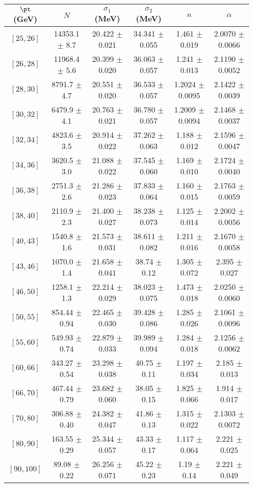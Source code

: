 \begin{tabular}{c||c|c|c|c|c}
$\pt$ (GeV) & $N$ & $\sigma_1$ (MeV) & $\sigma_2$ (MeV) & $n$ & $\alpha$ \\
\hline
$[25, 26]$ & 14353.1 $\pm$ 8.7 & 20.422 $\pm$ 0.021 & 34.341 $\pm$ 0.055 & 1.461 $\pm$ 0.019 & 2.0070 $\pm$ 0.0066\\
$[26, 28]$ & 11968.4 $\pm$ 5.6 & 20.399 $\pm$ 0.020 & 36.063 $\pm$ 0.057 & 1.241 $\pm$ 0.013 & 2.1190 $\pm$ 0.0052\\
$[28, 30]$ & 8791.7 $\pm$ 4.7 & 20.551 $\pm$ 0.020 & 36.533 $\pm$ 0.057 & 1.2024 $\pm$ 0.0095 & 2.1422 $\pm$ 0.0039\\
$[30, 32]$ & 6479.9 $\pm$ 4.1 & 20.763 $\pm$ 0.021 & 36.780 $\pm$ 0.057 & 1.2009 $\pm$ 0.0094 & 2.1468 $\pm$ 0.0037\\
$[32, 34]$ & 4823.6 $\pm$ 3.5 & 20.914 $\pm$ 0.022 & 37.262 $\pm$ 0.063 & 1.188 $\pm$ 0.012 & 2.1596 $\pm$ 0.0047\\
$[34, 36]$ & 3620.5 $\pm$ 3.0 & 21.088 $\pm$ 0.022 & 37.545 $\pm$ 0.060 & 1.169 $\pm$ 0.010 & 2.1724 $\pm$ 0.0040\\
$[36, 38]$ & 2751.3 $\pm$ 2.6 & 21.286 $\pm$ 0.023 & 37.833 $\pm$ 0.064 & 1.160 $\pm$ 0.015 & 2.1763 $\pm$ 0.0059\\
$[38, 40]$ & 2110.9 $\pm$ 2.3 & 21.400 $\pm$ 0.027 & 38.238 $\pm$ 0.073 & 1.125 $\pm$ 0.014 & 2.2002 $\pm$ 0.0056\\
$[40, 43]$ & 1540.8 $\pm$ 1.6 & 21.573 $\pm$ 0.031 & 38.611 $\pm$ 0.082 & 1.211 $\pm$ 0.016 & 2.1670 $\pm$ 0.0058\\
$[43, 46]$ & 1070.0 $\pm$ 1.4 & 21.658 $\pm$ 0.041 & 38.74 $\pm$ 0.12 & 1.305 $\pm$ 0.072 & 2.395 $\pm$ 0.027\\
$[46, 50]$ & 1258.1 $\pm$ 1.3 & 22.214 $\pm$ 0.029 & 38.023 $\pm$ 0.075 & 1.473 $\pm$ 0.018 & 2.0250 $\pm$ 0.0060\\
$[50, 55]$ & 854.44 $\pm$ 0.94 & 22.465 $\pm$ 0.030 & 39.428 $\pm$ 0.086 & 1.285 $\pm$ 0.026 & 2.1061 $\pm$ 0.0096\\
$[55, 60]$ & 549.93 $\pm$ 0.74 & 22.879 $\pm$ 0.033 & 39.989 $\pm$ 0.094 & 1.284 $\pm$ 0.018 & 2.1256 $\pm$ 0.0062\\
$[60, 66]$ & 343.27 $\pm$ 0.54 & 23.298 $\pm$ 0.038 & 40.75 $\pm$ 0.11 & 1.197 $\pm$ 0.034 & 2.185 $\pm$ 0.013\\
$[66, 70]$ & 467.44 $\pm$ 0.79 & 23.682 $\pm$ 0.060 & 38.05 $\pm$ 0.15 & 1.825 $\pm$ 0.066 & 1.914 $\pm$ 0.017\\
$[70, 80]$ & 306.88 $\pm$ 0.40 & 24.382 $\pm$ 0.047 & 41.86 $\pm$ 0.13 & 1.315 $\pm$ 0.022 & 2.1303 $\pm$ 0.0072\\
$[80, 90]$ & 163.55 $\pm$ 0.29 & 25.344 $\pm$ 0.057 & 43.33 $\pm$ 0.17 & 1.117 $\pm$ 0.064 & 2.221 $\pm$ 0.025\\
$[90, 100]$ & 89.08 $\pm$ 0.22 & 26.256 $\pm$ 0.071 & 45.22 $\pm$ 0.23 & 1.19 $\pm$ 0.14 & 2.221 $\pm$ 0.049\\
\end{tabular}
